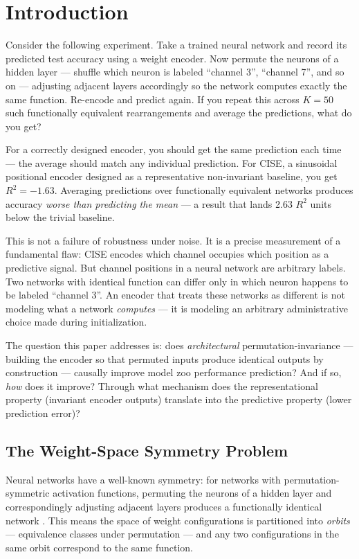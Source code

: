\section{Introduction}

Consider the following experiment. Take a trained neural network and record its predicted test accuracy using a weight encoder. Now permute the neurons of a hidden layer --- shuffle which neuron is labeled ``channel 3'', ``channel 7'', and so on --- adjusting adjacent layers accordingly so the network computes exactly the same function. Re-encode and predict again. If you repeat this across $K=50$ such functionally equivalent rearrangements and average the predictions, what do you get?

For a correctly designed encoder, you should get the same prediction each time --- the average should match any individual prediction. For CISE, a sinusoidal positional encoder designed as a representative non-invariant baseline, you get $R^2 = -1.63$. Averaging predictions over functionally equivalent networks produces accuracy \emph{worse than predicting the mean} --- a result that lands 2.63 $R^2$ units below the trivial baseline.

This is not a failure of robustness under noise. It is a precise measurement of a fundamental flaw: CISE encodes which channel occupies which position as a predictive signal. But channel positions in a neural network are arbitrary labels. Two networks with identical function can differ only in which neuron happens to be labeled ``channel 3''. An encoder that treats these networks as different is not modeling what a network \emph{computes} --- it is modeling an arbitrary administrative choice made during initialization.

The question this paper addresses is: does \emph{architectural} permutation-invariance --- building the encoder so that permuted inputs produce identical outputs by construction --- causally improve model zoo performance prediction? And if so, \emph{how} does it improve? Through what mechanism does the representational property (invariant encoder outputs) translate into the predictive property (lower prediction error)?

\subsection{The Weight-Space Symmetry Problem}

Neural networks have a well-known symmetry: for networks with permutation-symmetric activation functions, permuting the neurons of a hidden layer and correspondingly adjusting adjacent layers produces a functionally identical network \cite{Hecht-Nielsen1990}. This means the space of weight configurations is partitioned into \emph{orbits} --- equivalence classes under permutation --- and any two configurations in the same orbit correspond to the same function.


